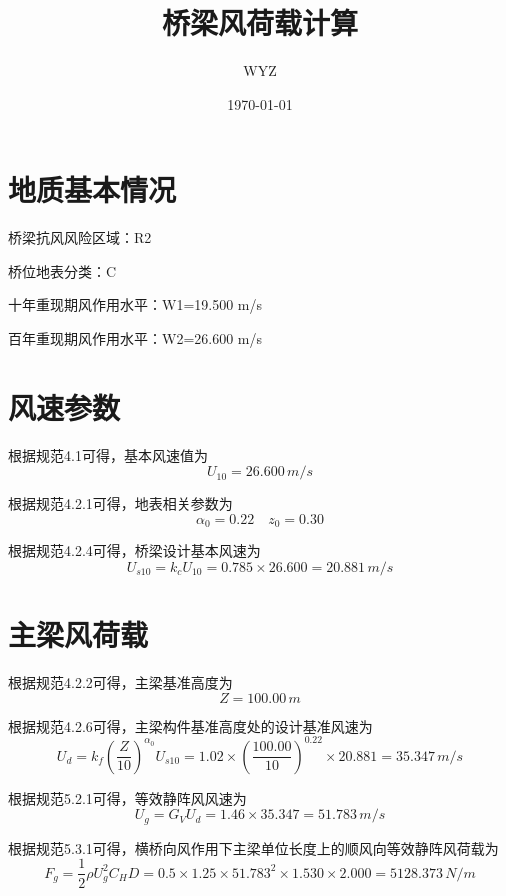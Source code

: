 \documentclass[cs4size, UTF8]{ctexart}%
\title{\heiti 桥梁风荷载计算}%
\author{WYZ}%
\date{\today}%
\begin{document}
%
\normalsize%
\maketitle%
\section{地质基本情况}%
\label{sec:}%
桥梁抗风风险区域：R2

        桥位地表分类：C

        十年重现期风作用水平：W1=19.500 m/s

        百年重现期风作用水平：W2=26.600 m/s
        

%
\section{风速参数}%
\label{sec:}%
根据规范4.1可得，基本风速值为%
\[%
U_{10}=26.600 \,m/s%
\]%

%
根据规范4.2.1可得，地表相关参数为%
\[%
\alpha_0=0.22 \quad z_0=0.30%
\]%

%
根据规范4.2.4可得，桥梁设计基本风速为%
\[%
U_{s10}=k_cU_{10}= 0.785\times26.600=20.881 \,m/s%
\]

%
\section{主梁风荷载}%
\label{sec:}%
根据规范4.2.2可得，主梁基准高度为%
\[%
Z=100.00 \,m%
\]%

%
根据规范4.2.6可得，主梁构件基准高度处的设计基准风速为%
\[%
U_d=k_f\left(\frac{Z}{10}\right)^{\alpha_0}U_{s10}= 1.02\times\left(\frac{100.00}{10}\right)^{0.22}\times20.881= 35.347 \,m/s%
\]%

%
根据规范5.2.1可得，等效静阵风风速为%
\[%
U_g=G_VU_d= 1.46\times35.347=51.783 \,m/s%
\]%

%
根据规范5.3.1可得，横桥向风作用下主梁单位长度上的顺风向等效静阵风荷载为%
\[%
F_g=\frac{1}{2}\rho U_g^2C_HD= 0.5\times1.25\times51.783^2\times1.530\times2.000= 5128.373 \,N/m%
\]

%
\end{document}
